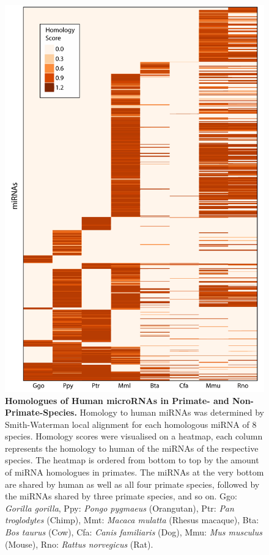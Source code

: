 \begin{figure}
\centering
\includegraphics[width=.9\textwidth]{figures/species-homo}
\caption[microRNA Species Homology.]{\textbf{Homologues of Human microRNAs in Primate- and Non-Primate-Species.} Homology to human miRNAs was determined by Smith-Waterman local alignment for each homologous miRNA of 8 species. Homology scores were visualised on a heatmap, each column represents the homology to human of the miRNAs of the respective species. The heatmap is ordered from bottom to top by the amount of miRNA homologues in primates. The miRNAs at the very bottom are shared by human as well as all four primate species, followed by the miRNAs shared by three primate species, and so on. Ggo: \emph{Gorilla gorilla}, Ppy: \emph{Pongo pygmaeus} (Orangutan), Ptr: \emph{Pan troglodytes} (Chimp), Mmt: \emph{Macaca mulatta} (Rhesus macaque), Bta: \emph{Bos taurus} (Cow), Cfa: \emph{Canis familiaris} (Dog), Mmu: \emph{Mus musculus} (Mouse), Rno: \emph{Rattus norvegicus} (Rat).
\label{fig:species-homo}}
\end{figure}


